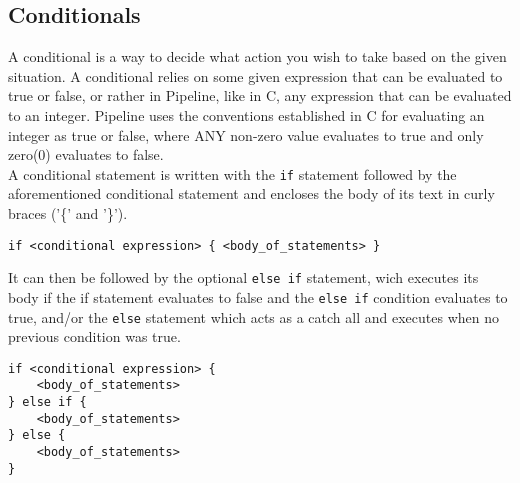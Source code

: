 \documentclass[./LRM_main.tex]{subfiles}
\begin{document}
\subsection{Conditionals}
A conditional is a way to decide what action you wish to take based on the given situation. A conditional relies on some given expression that can be evaluated to true or false, or rather in Pipeline, like in C, any expression that can be evaluated to an integer. Pipeline uses the conventions established in C for evaluating an integer as true or false, where ANY non-zero value evaluates to true and only zero(0) evaluates to false.\\
A conditional statement is written with the \texttt{if} statement followed by the aforementioned conditional statement and encloses the body of its text in curly braces ('\{' and '\}').
\begin{lstlisting}
if <conditional expression> { <body_of_statements> }
\end{lstlisting}
It can then be followed by the optional \texttt{else if} statement, wich executes its body if the if statement evaluates to false and the \texttt{else if} condition evaluates to true, and/or the \texttt{else} statement which acts as a catch all and executes when no previous condition was true.
\begin{lstlisting}
if <conditional expression> {
	<body_of_statements>
} else if {
	<body_of_statements>
} else {
	<body_of_statements>
}
\end{lstlisting}
\end{document}
